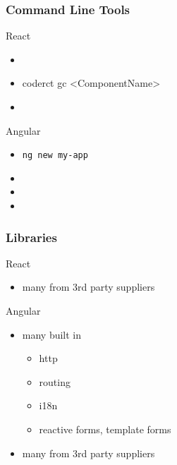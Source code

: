 \begin{frame}[fragile] \frametitle{Command Line Tools}
React
\begin{itemize}
  \item {}
  \item code{rct gc <ComponentName>}
  \item {}
\end{itemize}
\vspace{5mm}
Angular
\begin{itemize}
  \item \tt{ng new my-app}
  \item {}
  \item {}
  \item {}
\end{itemize}
\end{frame}

\begin{frame}[fragile] \frametitle{Libraries}
React
\begin{itemize}
  \item many from 3rd party suppliers
\end{itemize}
\vspace{5mm}
Angular
\begin{itemize}
  \item many built in
  \begin{itemize}
    \item http
    \item routing
    \item i18n
    \item reactive forms, template forms
  \end{itemize}
  \item many from 3rd party suppliers
\end{itemize}
\end{frame}


